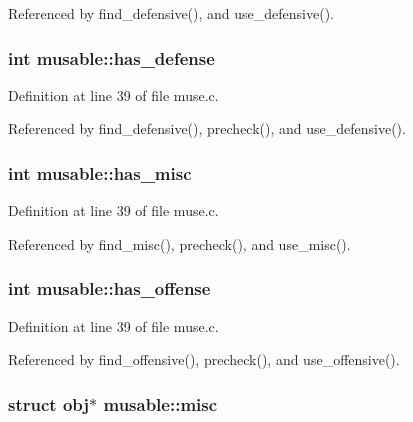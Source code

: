 Referenced by find\+\_\+defensive(), and use\+\_\+defensive().

\hypertarget{structmusable_a70288ed35c7e3f6a1f0905c39a16c2d3}{
\subsubsection[{has\+\_\+defense}]{\setlength{\rightskip}{0pt plus 5cm}int musable\+::has\+\_\+defense}}\label{structmusable_a70288ed35c7e3f6a1f0905c39a16c2d3}


Definition at line 39 of file muse.\+c.



Referenced by find\+\_\+defensive(), precheck(), and use\+\_\+defensive().

\hypertarget{structmusable_aa2d416f925ea6cbead5267d5462e4aef}{
\subsubsection[{has\+\_\+misc}]{\setlength{\rightskip}{0pt plus 5cm}int musable\+::has\+\_\+misc}}\label{structmusable_aa2d416f925ea6cbead5267d5462e4aef}


Definition at line 39 of file muse.\+c.



Referenced by find\+\_\+misc(), precheck(), and use\+\_\+misc().

\hypertarget{structmusable_af4b04fd9bf567b138538681c91d145e9}{
\subsubsection[{has\+\_\+offense}]{\setlength{\rightskip}{0pt plus 5cm}int musable\+::has\+\_\+offense}}\label{structmusable_af4b04fd9bf567b138538681c91d145e9}


Definition at line 39 of file muse.\+c.



Referenced by find\+\_\+offensive(), precheck(), and use\+\_\+offensive().

\hypertarget{structmusable_a7588e8e6ab60f4ea8fe12d61b674f52b}{
\subsubsection[{misc}]{\setlength{\rightskip}{0pt plus 5cm}struct {\bf obj}$\ast$ musable\+::misc}}\label{structmusable_a7588e8e6ab60f4ea8fe12d61b674f52b}


